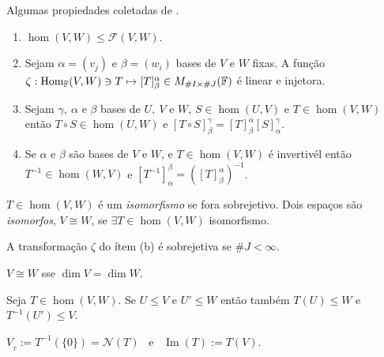 \begin{proposition}
\label{prop:0.1}
    Algumas propiedades coletadas de \cite[Seç. 6.1]{MA719}. 
    \begin{enumerate}[left = 0.55cm, label = (\alph*)]
        \item \(\hom(V,W) \leq \mathcal{F}(V,W)\). 
        \item Sejam \(\alpha = (v_j)\) e \(\beta = (w_i) \) bases de \(V\) e \(W\) fixas. A função  \(\zeta : \operatorname{Hom}_{\mathbb{F}}(V,W) \ni T \mapsto [T]^\alpha_\beta \in M_{\#I \times \#J}(\mathbb{F}) \) é linear e injetora. 
        \item Sejam \(\gamma, \ \alpha\) e \(\beta\) bases de \(U,\ V\) e \(W\), \(S \in \hom(U,V)\) e \(T\in \hom(V,W)\) então \(T\circ S \in \hom(U,W)\) e \([T\circ S]^\gamma_\beta = [T]^\alpha_\beta [S]^\gamma_\alpha\).
        \item Se \(\alpha \) e \(\beta \) são bases de \(V\) e \(W\), e \(T \in \hom(V,W)\) é invertivél então \(T^{-1} \in \hom(W,V)\) e \([T^{-1}]^\beta_\alpha = ([T]^\alpha_\beta)^{-1}\).
    \end{enumerate}
\end{proposition}

\begin{definition}
    \(T\in \hom(V,W)\) é um \emph{isomorfismo} se fora sobrejetivo. Dois espaços são \emph{isomorfos}, \(V\cong W\), se \(\exists T\in \hom(V,W)\) isomorfismo.  
\end{definition}

\begin{note}
    A transformação \(\zeta\) do ítem (b) é sobrejetiva se \(\#J < \infty\).
\end{note}

\begin{theorem}
    \(V\cong W\) sse \(\dim V = \dim W\). 
\end{theorem}

\begin{proposition}
    Seja \(T\in \hom(V,W)\). Se \(U \leq V\) e \(U'\leq W\) então também \(T(U)\leq W\) e \(T^{-1}(U')\leq V\). 
\end{proposition}

\begin{definition}
    \centering 
    \(V_{_T} := T^{-1}(\{0\}) = \mathcal{N}(T)\) \  e \  \(\operatorname{Im}(T) := T(V)\). 
\end{definition}


